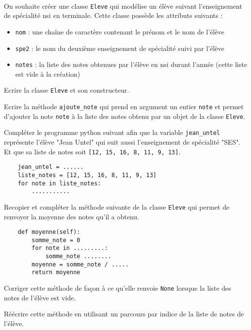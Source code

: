 \documentclass[11pt,a4paper]{article}
\begin{document}
 \\
On souhaite créer une classe {\tt Eleve} qui modélise un élève suivant l'enseignement de spécialité {\sc nsi} en terminale. Cette classe possède les attributs suivants :
\begin{itemize}
	\item {\tt nom} : une chaîne de caractère contenant le prénom et le nom de l'élève
	\item {\tt spe2} : le nom du deuxième enseignement de spécialité suivi par l'élève
	\item {\tt notes} : la liste des notes obtenues par l'élève en {\sc nsi} durant l'année (cette liste est vide à la création)
\end{itemize}
\QListe
\item Ecrire la classe {\tt Eleve} et son constructeur.
\item Ecrire la méthode {\tt ajoute\_note} qui prend en argument un entier {\tt note} et permet d'ajouter la note {\tt note} à la liste des notes obtenu par un objet de la classe {\tt Eleve}.
\item Compléter le programme python suivant afin que la variable {\tt jean\_untel} représente l'élève  "Jean Untel" qui suit aussi l'enseignement de spécialité "SES". Et que sa liste de notes soit {\tt [12, 15, 16, 8, 11, 9, 13]}.
\begin{lstlisting}
    jean_untel = ......
    liste_notes = [12, 15, 16, 8, 11, 9, 13]
    for note in liste_notes:
        ...........
\end{lstlisting}
\item Recopier et compléter la méthode suivante de la classe {\tt Eleve} qui permet de renvoyer la moyenne des notes qu'il a obtenu.
\begin{lstlisting}
    def moyenne(self):
        somme_note = 0
        for note in .........:
            somme_note ........
        moyenne = somme_note / .....
        return moyenne
\end{lstlisting}
\item Corriger cette méthode de façon à ce qu'elle renvoie {\tt None} lorsque la liste des notes de l'élève est vide.
\item Réécrire cette méthode en utilisant un parcours par indice de la liste de notes de l'élève.
\FinListe
\end{document}
